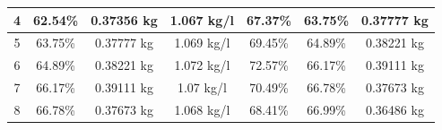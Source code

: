 \begin{longtable}{|p{1cm}|p{1.7cm}|p{2cm}|p{2cm}|p{2cm}| p{1cm}| p{1cm}|}
             \\
             \hline
             
             \multicolumn{1}{|c|}{4} 
             & \multicolumn{1}{c|}{62.54\%}  %
             & \multicolumn{1}{c|}{0.37356 kg} %
             & \multicolumn{1}{c|}{1.067 kg/l} %
             & \multicolumn{1}{c|}{67.37\%} %
             & \multicolumn{1}{c|}{63.75\%} %
             & \multicolumn{1}{c|}{0.37777 kg} %
             
             \\
             \hline
             
             \multicolumn{1}{|c|}{5} 
             & \multicolumn{1}{c|}{63.75\%} 
             & \multicolumn{1}{c|}{0.37777 kg}
             & \multicolumn{1}{c|}{1.069 kg/l}
             & \multicolumn{1}{c|}{69.45\%}
             & \multicolumn{1}{c|}{64.89\%} 
             & \multicolumn{1}{c|}{0.38221 kg} 

             \\
             \hline
             
             \multicolumn{1}{|c|}{6} 
             & \multicolumn{1}{c|}{64.89\%}  
             & \multicolumn{1}{c|}{0.38221 kg} 
             & \multicolumn{1}{c|}{1.072 kg/l}
             & \multicolumn{1}{c|}{72.57\%}
             & \multicolumn{1}{c|}{66.17\%} 
             &\multicolumn{1}{c|}{0.39111 kg} 

             \\
             \hline
             
             \multicolumn{1}{|c|}{7} 
             & \multicolumn{1}{c|}{66.17\%}  
             & \multicolumn{1}{c|}{0.39111 kg} 
             & \multicolumn{1}{c|}{1.07 kg/l}
             & \multicolumn{1}{c|}{70.49\%}
             & \multicolumn{1}{c|}{66.78\%} 
             & \multicolumn{1}{c|}{0.37673 kg} 
             \\
             \hline
             
             \multicolumn{1}{|c|}{8} 
             & \multicolumn{1}{c|}{66.78\%}  
             & \multicolumn{1}{c|}{0.37673 kg}
             & \multicolumn{1}{c|}{1.068 kg/l}
             & \multicolumn{1}{c|}{68.41\%}
             & \multicolumn{1}{c|}{66.99\%} 
             & \multicolumn{1}{c|}{0.36486 kg} 
             
             \\
             \hline
             

\end{longtable}

